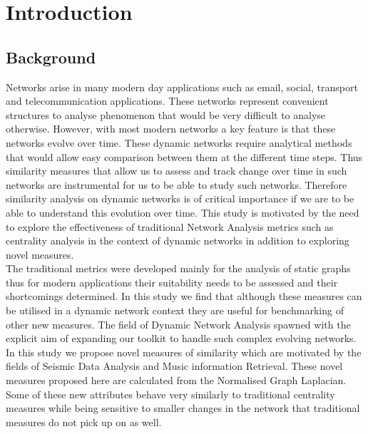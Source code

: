 \chapter{Introduction}

\section{Background}
Networks arise in many modern day applications such as email, social, transport and telecommunication applications. These networks represent convenient structures to analyse phenomenon that would be very difficult to analyse otherwise. However, with most modern networks a key feature is that these networks evolve over time. These dynamic networks require analytical methods that would allow easy comparison between them at the different time steps. Thus similarity measures that allow us to assess and track change over time in such networks are instrumental for us to be able to study such networks. Therefore similarity analysis on dynamic networks is of critical importance if we are to be able to understand this evolution over time. This study is motivated by the need to explore the effectiveness of traditional Network Analysis metrics such as centrality analysis in the context of dynamic networks in addition to exploring novel measures. \\

The traditional metrics were developed mainly for the analysis of static graphs thus for modern applications their suitability needs to be assessed and their shortcomings determined. In this study we find that although these measures can be utilised in a dynamic network context they are useful for benchmarking of other new measures.
The field of Dynamic Network Analysis spawned with the explicit aim of expanding our toolkit to handle such complex evolving networks.  \\

In this study we propose novel measures of similarity which are motivated by the fields of Seismic Data Analysis and Music information Retrieval. These novel measures proposed here are calculated from the Normalised Graph Laplacian. Some of these new attributes behave very similarly to traditional centrality measures while being sensitive to smaller changes in the network that traditional measures do not pick up on as well. \\

